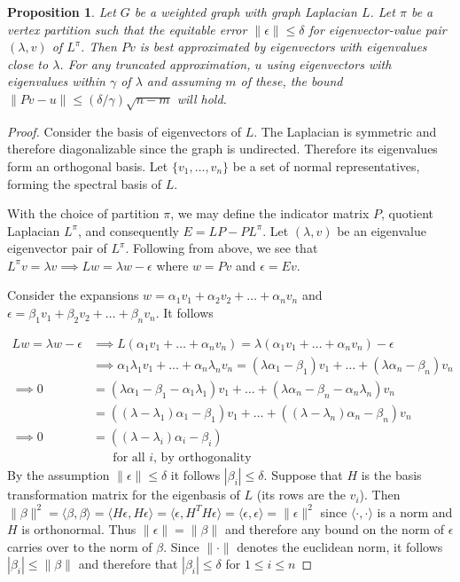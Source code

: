 \documentclass[%
 aip,
 amsmath,amssymb,
preprint,
reprint, onecolumn %
]{revtex4-1}
\newtheorem{prop}[theorem]{Proposition}
\begin{document}
\begin{prop}\label{prop:Best_Approx}
    Let $G$ be a weighted graph with graph Laplacian $L$. Let $\pi$ be a vertex partition such that the equitable error $\|\epsilon\| \leq \delta$ for eigenvector-value pair $(\lambda,v)$ of $L^\pi$. Then $Pv$ is best approximated by eigenvectors with eigenvalues close to $\lambda$. For any truncated approximation, $u$ using eigenvectors with eigenvalues within $\gamma$ of $\lambda$ and assuming $m$ of these, the bound $\|Pv-u\| \leq (\delta/\gamma) \sqrt{n-m}$ will hold. 
\end{prop}

\begin{proof}
    Consider the basis of eigenvectors of $L$. The Laplacian is symmetric and therefore diagonalizable since the graph is undirected. Therefore its eigenvalues form an orthogonal basis.  Let $\{v_1,\dotsc,v_n\}$ be a set of normal representatives, forming the spectral basis of $L$.

    With the choice of partition $\pi$, we may define the indicator matrix $P$, quotient Laplacian $L^\pi$, and consequently $E=LP-PL^\pi$. Let $(\lambda,v)$ be an eigenvalue eigenvector pair of $L^\pi$. Following from above, we see that $L^\pi v=\lambda v \implies Lw= \lambda w - \epsilon$ where $w=Pv$ and $\epsilon = Ev$.
    
    Consider the expansions $w=\alpha_1 v_1+\alpha_2 v_2+\dotsc+\alpha_n v_n$ and $\epsilon=\beta_1 v_1+\beta_2 v_2+\dotsc+\beta_n v_n$. It follows
    
    
    \begin{align*}
        Lw=\lambda w -\epsilon &\implies L(\alpha_1 v_1+\dotsc+\alpha_n v_n) = \lambda(\alpha_1 v_1+\dotsc+\alpha_n v_n)- \epsilon\\
        &\implies 
        \alpha_1 \lambda_1 v_1+\dotsc+\alpha_n \lambda_n v_n = (\lambda \alpha_1 - \beta_1 ) v_1+\dotsc+ (\lambda \alpha_n -\beta_n) v_n\\
        \implies 
        0 &= (\lambda \alpha_1 - \beta_1 - \alpha_1\lambda_1 ) v_1+\dotsc+ (\lambda \alpha_n -\beta_n -\alpha_n\lambda_n) v_n\\
        &= ((\lambda-\lambda_1) \alpha_1 - \beta_1) v_1+\dotsc+ ((\lambda-\lambda_n) \alpha_n -\beta_n) v_n\\
        \implies 
        0 &= ((\lambda-\lambda_i)\alpha_i-\beta_i) \\&\hspace{20pt}\text{for all $i$, by orthogonality}
    \end{align*}
    By the assumption $\|\epsilon\|\leq \delta$ it follows $|\beta_i|\leq\delta$. 
    Suppose that $H$ is the basis transformation matrix for the eigenbasis of $L$ (its rows are the $v_i$). Then $\|\beta\|^2=\langle 
    \beta,\beta \rangle=\langle 
    H\epsilon,H \epsilon \rangle=\langle 
    \epsilon,H^TH\epsilon \rangle=\langle 
    \epsilon,\epsilon \rangle=\|\epsilon\|^2$ since $\langle \cdot,\cdot\rangle$ is a norm and $H$ is orthonormal. Thus $\|\epsilon \|=\|\beta\|$ and therefore any bound on the norm of $\epsilon$ carries over to the norm of $\beta$. Since $\|\cdot\|$ denotes the euclidean norm, it follows $|\beta_i|\leq \|\beta\|$ and therefore that $|\beta_i|\leq \delta$ for $1\leq i\leq n$
    

\end{proof}
\end{document}
